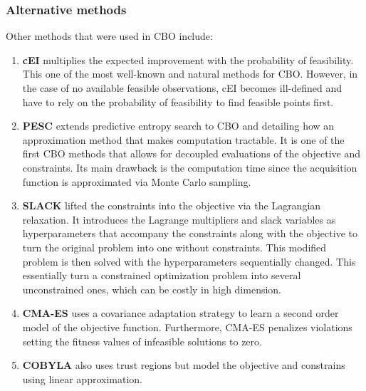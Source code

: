 \subsubsection{Alternative methods}
Other methods that were used in CBO include:
\begin{enumerate}
    \item \textbf{cEI} \cite{gardner2014bayesian} multiplies the expected improvement with the probability of feasibility. This one of the most well-known and natural methods for CBO. However, in the case of no available feasible observations, cEI becomes ill-defined and have to rely on the probability of feasibility to find feasible points first. 
    \item \textbf{PESC} \cite{hern2016general} extends predictive entropy search to CBO and detailing how an approximation method that makes computation tractable. It is one of the first CBO methods that allows for decoupled evaluations of the objective and constraints. Its main drawback is the computation time since the acquisition function is approximated via Monte Carlo sampling.
    \item \textbf{SLACK} \cite{picheny2016bayesian} lifted the constraints into the objective via the Lagrangian relaxation. It introduces the Lagrange multipliers and slack variables as hyperparameters that accompany the constraints along with the objective to turn the original problem into one without constraints. This modified problem is then solved with the hyperparameters sequentially changed. This essentially turn a constrained optimization problem into several unconstrained ones, which can be costly in high dimension.
    \item \textbf{CMA-ES} \cite{kramer2010review} uses a covariance adaptation strategy to learn a second order model of the objective function. Furthermore, CMA-ES penalizes violations setting the fitness values of infeasible solutions to zero.
    \item  \textbf{COBYLA} \cite{powell1994direct} also uses trust regions but model the objective and constrains using linear approximation.
\end{enumerate}

